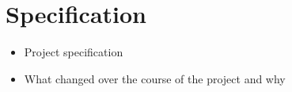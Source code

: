 \chapter{Specification}
\label{chap:specification}


\begin{itemize}
  \item Project specification
  \item What changed over the course of the project and why
\end{itemize}


